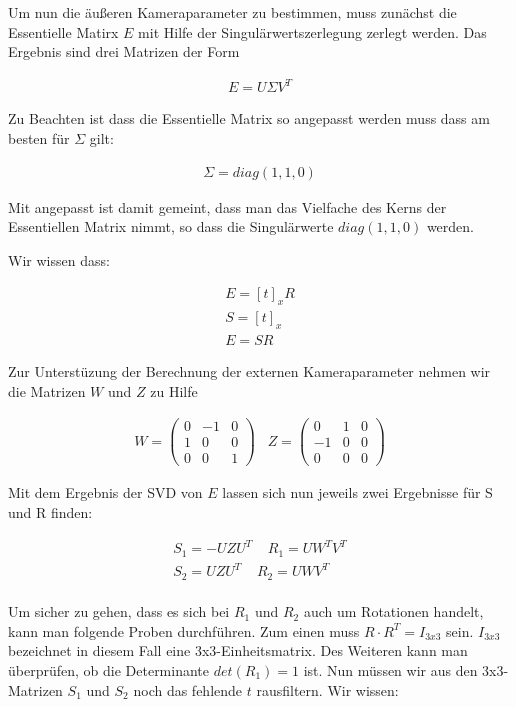	
Um nun die äußeren Kameraparameter zu bestimmen, muss zunächst die Essentielle Matirx \ensuremath{E} mit Hilfe der Singulärwertszerlegung zerlegt werden. Das Ergebnis sind drei Matrizen der Form 

\begin{gather}
E = U\Sigma V^T
\end{gather}

Zu Beachten ist dass die Essentielle Matrix so angepasst werden muss dass am besten für \ensuremath{\Sigma} gilt:

\begin{gather}
\Sigma = diag(1,1,0)
\end{gather}

Mit angepasst ist damit gemeint, dass man das Vielfache des Kerns der Essentiellen Matrix nimmt, so dass die Singulärwerte \ensuremath{diag(1,1,0)} werden.

Wir wissen dass:

\begin{gather}
E=[t]_xR\\
S =[t]_x\\
E=SR
\end{gather}

Zur Unterstüzung der Berechnung der externen Kameraparameter nehmen wir die Matrizen \ensuremath{W} und \ensuremath{Z} zu Hilfe

\begin{gather}
W = \begin{pmatrix}
0&-1&0\\
1&0&0\\
0&0&1
\end{pmatrix} \;\;\;
Z=
\begin{pmatrix}
0&1&0\\
-1&0&0\\
0&0&0
\end{pmatrix}
\end{gather}

Mit dem Ergebnis der SVD von \ensuremath{E} lassen sich nun jeweils zwei Ergebnisse für S und R finden:	

\begin{gather}
S_1 = -UZU^T \;\;\;\; R_1 = UW^TV^T\\
S_2 = UZU^T \;\;\;\; R_2 = UWV^T
\end{gather}\\

Um sicher zu gehen, dass es sich bei \ensuremath{R_1} und \ensuremath{R_2} auch um Rotationen handelt, kann man folgende Proben durchführen. Zum einen muss \ensuremath{R\cdot R^T=I_{3x3}} sein. \ensuremath{I_{3x3}} bezeichnet in diesem Fall eine 3x3-Einheitsmatrix. Des Weiteren kann man überprüfen, ob die Determinante \ensuremath{det(R_1) = 1} ist. Nun müssen wir aus den 3x3-Matrizen \ensuremath{S_1} und \ensuremath{S_2} noch das fehlende \ensuremath{t} rausfiltern. Wir wissen:

